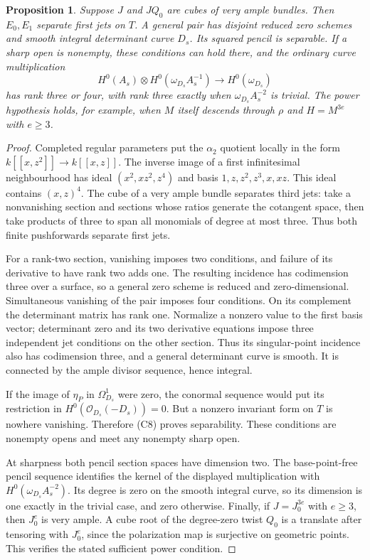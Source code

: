 \documentclass[11pt]{article}
\newtheorem{proposition}[theorem]{Proposition}
\theoremstyle{definition}\newtheorem{definition}[theorem]{Definition}
\theoremstyle{remark}\newtheorem{remark}[theorem]{Remark}
\newcommand{\OO}{\mathcal O}
\begin{document}
\begin{proposition}\label{prop:jets}
Suppose $J$ and $JQ_0$ are cubes of very ample bundles. Then $E_0,E_1$ separate first jets on $T$. A general pair has disjoint reduced zero schemes and smooth integral determinant curve $D_s$. Its squared pencil is separable. If a sharp open is nonempty, these conditions can hold there, and the ordinary curve multiplication
\[
 H^0(A_s)\otimes H^0(\omega_{D_s}A_s^{-1})
          \longrightarrow H^0(\omega_{D_s})
\]
has rank three or four, with rank three exactly when
$\omega_{D_s}A_s^{-2}$ is trivial. The power hypothesis holds, for example, when $M$ itself descends through $\rho$ and $H=M^{3e}$ with $e\ge3$.
\end{proposition}
\begin{proof}
Completed regular parameters put the $\alpha _2$ quotient locally in the form
$k[[x,z^2]]\to k[[x,z]]$. The inverse image of a first infinitesimal neighbourhood has ideal $(x^2,xz^2,z^4)$ and basis
$1,z,z^2,z^3,x,xz$. This ideal contains $(x,z)^4$.
The cube of a very ample bundle separates third jets: take a nonvanishing section and sections whose ratios generate the cotangent space, then take products of three to span all monomials of degree at most three. Thus both finite pushforwards separate first jets.

For a rank-two section, vanishing imposes two conditions, and failure of its derivative to have rank two adds one. The resulting incidence has codimension three over a surface, so a general zero scheme is reduced and zero-dimensional. Simultaneous vanishing of the pair imposes four conditions. On its complement the determinant matrix has rank one. Normalize a nonzero value to the first basis vector; determinant zero and its two derivative equations impose three independent jet conditions on the other section. Thus its singular-point incidence also has codimension three, and a general determinant curve is smooth. It is connected by the ample divisor sequence, hence integral.

If the image of $\eta_P$ in $\Omega_{D_s}^1$ were zero, the conormal sequence would put its restriction in $H^0(\OO_{D_s}(-D_s))=0$. But a nonzero invariant form on $T$ is nowhere vanishing. Therefore (C8) proves separability. These conditions are nonempty opens and meet any nonempty sharp open.

At sharpness both pencil section spaces have dimension two. The base-point-free pencil sequence identifies the kernel of the displayed multiplication with $H^0(\omega_{D_s}A_s^{-2})$. Its degree is zero on the smooth integral curve, so its dimension is one exactly in the trivial case, and zero otherwise. Finally, if $J=J_0^{3e}$ with $e\ge3$, then $J_0^e$ is very ample. A cube root of the degree-zero twist $Q_0$ is a translate after tensoring with $J_0^e$, since the polarization map is surjective on geometric points. This verifies the stated sufficient power condition.
\end{proof}
\end{document}
